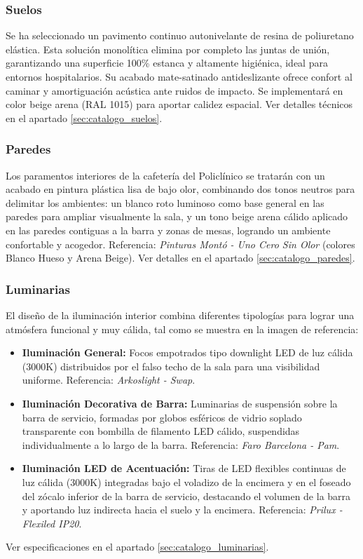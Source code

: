 \documentclass[12pt,a4paper]{article}
\begin{document}
\subsubsection{Suelos}
Se ha seleccionado un pavimento continuo autonivelante de resina de poliuretano elástica. Esta solución monolítica elimina por completo las juntas de unión, garantizando una superficie 100\% estanca y altamente higiénica, ideal para entornos hospitalarios. Su acabado mate-satinado antideslizante ofrece confort al caminar y amortiguación acústica ante ruidos de impacto. Se implementará en color beige arena (RAL 1015) para aportar calidez espacial. Ver detalles técnicos en el apartado \ref{sec:catalogo_suelos}.

\subsubsection{Paredes}
Los paramentos interiores de la cafetería del Policlínico se tratarán con un acabado en pintura plástica lisa de bajo olor, combinando dos tonos neutros para delimitar los ambientes: un blanco roto luminoso como base general en las paredes para ampliar visualmente la sala, y un tono beige arena cálido aplicado en las paredes contiguas a la barra y zonas de mesas, logrando un ambiente confortable y acogedor. Referencia: \textit{Pinturas Montó - Uno Cero Sin Olor} (colores Blanco Hueso y Arena Beige). Ver detalles en el apartado \ref{sec:catalogo_paredes}.

\subsubsection{Luminarias}
El diseño de la iluminación interior combina diferentes tipologías para lograr una atmósfera funcional y muy cálida, tal como se muestra en la imagen de referencia:
\begin{itemize}
    \item \textbf{Iluminación General:} Focos empotrados tipo downlight LED de luz cálida (3000K) distribuidos por el falso techo de la sala para una visibilidad uniforme. Referencia: \textit{Arkoslight - Swap}.
    \item \textbf{Iluminación Decorativa de Barra:} Luminarias de suspensión sobre la barra de servicio, formadas por globos esféricos de vidrio soplado transparente con bombilla de filamento LED cálido, suspendidas individualmente a lo largo de la barra. Referencia: \textit{Faro Barcelona - Pam}.
    \item \textbf{Iluminación LED de Acentuación:} Tiras de LED flexibles continuas de luz cálida (3000K) integradas bajo el voladizo de la encimera y en el foseado del zócalo inferior de la barra de servicio, destacando el volumen de la barra y aportando luz indirecta hacia el suelo y la encimera. Referencia: \textit{Prilux - Flexiled IP20}.
\end{itemize}
Ver especificaciones en el apartado \ref{sec:catalogo_luminarias}.
\end{document}
